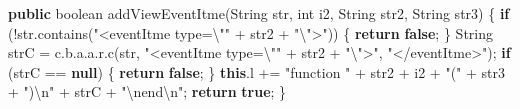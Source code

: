\documentclass[
]{article}
\newenvironment{Shaded}{}{}
\newcommand{\BuiltInTok}[1]{\textcolor[rgb]{0.00,0.50,0.00}{#1}}
\newcommand{\ControlFlowTok}[1]{\textcolor[rgb]{0.00,0.44,0.13}{\textbf{#1}}}
\newcommand{\DataTypeTok}[1]{\textcolor[rgb]{0.56,0.13,0.00}{#1}}
\newcommand{\FunctionTok}[1]{\textcolor[rgb]{0.02,0.16,0.49}{#1}}
\newcommand{\KeywordTok}[1]{\textcolor[rgb]{0.00,0.44,0.13}{\textbf{#1}}}
\newcommand{\NormalTok}[1]{#1}
\newcommand{\OperatorTok}[1]{\textcolor[rgb]{0.40,0.40,0.40}{#1}}
\newcommand{\SpecialCharTok}[1]{\textcolor[rgb]{0.25,0.44,0.63}{#1}}
\newcommand{\StringTok}[1]{\textcolor[rgb]{0.25,0.44,0.63}{#1}}
\begin{document}
\begin{Shaded}
\begin{Highlighting}[]
    \KeywordTok{public} \DataTypeTok{boolean} \FunctionTok{addViewEventItme}\OperatorTok{(}\BuiltInTok{String}\NormalTok{ str}\OperatorTok{,} \DataTypeTok{int}\NormalTok{ i2}\OperatorTok{,} \BuiltInTok{String}\NormalTok{ str2}\OperatorTok{,} \BuiltInTok{String}\NormalTok{ str3}\OperatorTok{)} \OperatorTok{\{}
        \ControlFlowTok{if} \OperatorTok{(!}\NormalTok{str}\OperatorTok{.}\FunctionTok{contains}\OperatorTok{(}\StringTok{"\textless{}eventItme type=}\SpecialCharTok{\textbackslash{}"}\StringTok{"} \OperatorTok{+}\NormalTok{ str2 }\OperatorTok{+} \StringTok{"}\SpecialCharTok{\textbackslash{}"}\StringTok{\textgreater{}"}\OperatorTok{))} \OperatorTok{\{}
            \ControlFlowTok{return} \KeywordTok{false}\OperatorTok{;}
        \OperatorTok{\}}
        \BuiltInTok{String}\NormalTok{ strC }\OperatorTok{=}\NormalTok{ c}\OperatorTok{.}\FunctionTok{b}\OperatorTok{.}\FunctionTok{a}\OperatorTok{.}\FunctionTok{a}\OperatorTok{.}\FunctionTok{r}\OperatorTok{.}\FunctionTok{c}\OperatorTok{(}\NormalTok{str}\OperatorTok{,} \StringTok{"\textless{}eventItme type=}\SpecialCharTok{\textbackslash{}"}\StringTok{"} \OperatorTok{+}\NormalTok{ str2 }\OperatorTok{+} \StringTok{"}\SpecialCharTok{\textbackslash{}"}\StringTok{\textgreater{}"}\OperatorTok{,} \StringTok{"\textless{}/eventItme\textgreater{}"}\OperatorTok{);}
        \ControlFlowTok{if} \OperatorTok{(}\NormalTok{strC }\OperatorTok{==} \KeywordTok{null}\OperatorTok{)} \OperatorTok{\{}
            \ControlFlowTok{return} \KeywordTok{false}\OperatorTok{;}
        \OperatorTok{\}}
        \KeywordTok{this}\OperatorTok{.}\FunctionTok{l} \OperatorTok{+=} \StringTok{"function "} \OperatorTok{+}\NormalTok{ str2 }\OperatorTok{+}\NormalTok{ i2 }\OperatorTok{+} \StringTok{"("} \OperatorTok{+}\NormalTok{ str3 }\OperatorTok{+} \StringTok{")}\SpecialCharTok{\textbackslash{}n}\StringTok{"} \OperatorTok{+}\NormalTok{ strC }\OperatorTok{+} \StringTok{"}\SpecialCharTok{\textbackslash{}n}\StringTok{end}\SpecialCharTok{\textbackslash{}n}\StringTok{"}\OperatorTok{;}
        \ControlFlowTok{return} \KeywordTok{true}\OperatorTok{;}
    \OperatorTok{\}}


\end{Highlighting}
\end{Shaded}
\end{document}
